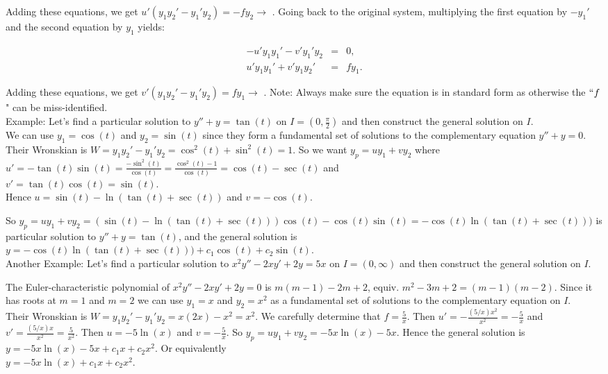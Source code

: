 \documentclass{ximera}
\begin{document}
Adding these equations, we get $u'(y_1y_2'-y_1'y_2)=-fy_2\rightarrow $ .  Going back to the original system, multiplying the first equation by $-y_1'$ and the second equation by $y_1$ yields:

\begin{eqnarray*}
  -u'y_1y_1'-v'y_1'y_2 &=& 0, \\
  u'y_1y_1'+v'y_1y_2' &=& fy_1.
\end{eqnarray*}


Adding these equations, we get $v'(y_1y_2'-y_1'y_2)=fy_1\rightarrow $ . Note: Always make sure the equation is in standard form as otherwise the $``f$" can be miss-identified.\\


Example:  Let's find a particular solution to $y''+y=\tan{(t)}$ on $I=\left(0,\frac{\pi}{2}\right)$ and then construct the general solution on $I$.\\

We can use $y_1=\cos{(t)}$ and $y_2=\sin{(t)}$ since they form a fundamental set of solutions to the complementary equation $y''+y=0$.\\

Their Wronskian is $W=y_1y_2'-y_1'y_2=\cos^2{(t)}+\sin^2{(t)}=1$.  So we want $y_p=uy_1+vy_2$ where \\$\displaystyle u'=-\tan{(t)}\sin{(t)}=\frac{-\sin^2{(t)}}{\cos{(t)}}=\frac{\cos^2{(t)}-1}{\cos{(t)}}=\cos{(t)}-\sec{(t)}$ and \\ $v'=\tan{(t)}\cos{(t)}=\sin{(t)}$.\\

Hence $u=\sin{(t)}-\ln{(\tan{(t)}+\sec{(t)})}$ and $v=-\cos{(t)}$.

 So $y_p=uy_1+vy_2=(\sin{(t)}-\ln{(\tan{(t)}+\sec{(t)})})\cos{(t)}-\cos{(t)}\sin{(t)}=-\cos{(t)}\ln{(\tan{(t)}+\sec{(t)})})$ is  particular solution to $y''+y=\tan{(t)}$, and the general solution is \\ $y=-\cos{(t)}\ln{(\tan{(t)}+\sec{(t)})})+c_1\cos{(t)}+c_2\sin{(t)}$.\\


Another Example:  Let's find a particular solution to $x^2 y''-2xy'+2y=5x$ on $I=(0,\infty)$ and then construct the general solution on $I$.

The Euler-characteristic polynomial of $x^2 y''-2xy'+2y=0$ is $m(m-1)-2m+2$, equiv. $m^2-3m+2=(m-1)(m-2)$.  Since it has roots at $m=1$ and $m=2$ we can use $y_1=x$ and $y_2=x^2$ as a fundamental set of solutions to the complementary equation on $I$.\\

Their Wronskian is $W=y_1y_2'-y_1'y_2=x(2x)-x^2=x^2$.  We carefully determine that $\displaystyle f=\frac{5}{x}$.  Then $\displaystyle u'=-\frac{(5/x)x^2}{x^2}=-\frac{5}{x}$ and $\displaystyle v'=\frac{(5/x)x}{x^2}=\frac{5}{x^2}$.  Then $u=-5\ln{(x)}$ and $\displaystyle v=-\frac{5}{x}$.  So $\displaystyle y_p=uy_1+vy_2=-5x\ln{(x)}-5x$.  Hence the general solution is $y=-5x\ln{(x)}-5x+c_1x+c_2x^2$. Or equivalently \\$y=-5x\ln{(x)}+c_1x+c_2x^2$.
\end{document}

